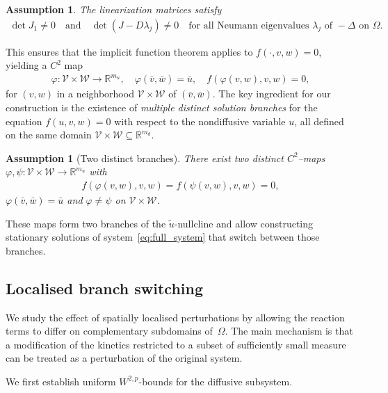 \documentclass[12pt, a4paper]{amsart}
\numberwithin{equation}{section}
\newcommand{\RR}{\mathbb{R}}
\newcommand{\Cun}{\bar{\un}}
\newcommand{\Cus}{\bar{\us}}
\newcommand{\Cuf}{\bar{\uf}}
\newcommand{\Nun}{\tilde{\un}}
\newcommand{\un}{u}
\newcommand{\us}{v}
\newcommand{\uf}{w}
\newcommand{\mn}{m_{u}}  %
\newcommand{\md}{m_{d}}  %
\newcommand{\fn}{f}
\newenvironment{nalign}
{\begin{equation}\begin{aligned}}
		{\end{aligned}\end{equation}\ignorespacesafterend}
\newtheorem{assumption}[theorem]{\bf Assumption}
\begin{document}
\begin{assumption}
\label{ass:StatSol}
The linearization matrices satisfy
\begin{nalign}
    \det J_1 \neq 0 \quad \text{and} \quad \det \left(J - D\lambda_j \right)\neq 0 \quad \text{for all Neumann eigenvalues } \lambda_j \text{ of } -\Delta \text{ on } \Omega.
    \end{nalign}
\end{assumption}
This ensures that the implicit function theorem applies to $\fn(\cdot, \us, \uf) = 0$, yielding a $C^2$ map
\begin{align*}
    \varphi:\mathcal{V}\times\mathcal{W} \to \mathbb{R}^{\mn},\quad \varphi(\Cus, \Cuf) = \Cun,\quad \fn(\varphi(\us,\uf),\us,\uf) = 0,
\end{align*}
for $(\us, \uf)$ in a neighborhood $\mathcal{V}\times\mathcal{W}$ of $(\Cus, \Cuf)$.
The key ingredient for our construction is the existence of \textit{multiple distinct solution branches} for the equation $\fn(\un, \us, \uf) = 0$ with respect to the nondiffusive variable $\un$, all defined on the same domain $\mathcal V \times \mathcal W \subseteq \RR^{\md}$.
\begin{assumption}[Two distinct branches]
\label{ass:DiscontinuousStationaryTwoBranches}
There exist two distinct $C^2$--maps $\varphi,\psi:\mathcal{V}\times\mathcal{W}\to\mathbb{R}^{\mn}$ with
\begin{align*}
    \fn(\varphi(\us,\uf),\us,\uf) = \fn(\psi(\us,\uf),\us,\uf) = 0,
\end{align*}
$\varphi(\Cus,\Cuf) = \Cun$ and $\varphi\neq\psi$ on $\mathcal{V}\times\mathcal{W}$.
\end{assumption}
These maps form two branches of the $\Nun$-nullcline and allow constructing stationary solutions of system~\eqref{eq:full_system} that switch between those branches.

\subsection{Localised branch switching}
We study the effect of spatially localised perturbations by allowing the reaction terms to differ on complementary subdomains of~$\Omega$. The main mechanism is that a modification of the kinetics restricted to a subset of sufficiently small measure can be treated as a perturbation of the original system.

We first establish uniform $W^{2,p}$-bounds for the diffusive subsystem.
\end{document}

